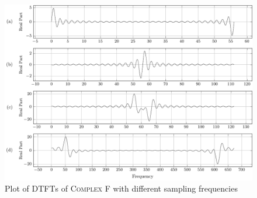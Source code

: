 \documentclass[../../course]{subfiles}
\begin{document}
\vfill

\begin{figure} [H]
    \centering
     {
        \includegraphics[height = 0.8\textheight] {tikzpics/plotDtftComplexF64.pdf}
    }
     {Plot of \textsc{DTFT}s of \textsc{Complex F} with different sampling frequencies}
    \label{plt:dtftComplexF}
\end{figure}






%
%
%
%
%
%
%
\end{document}
